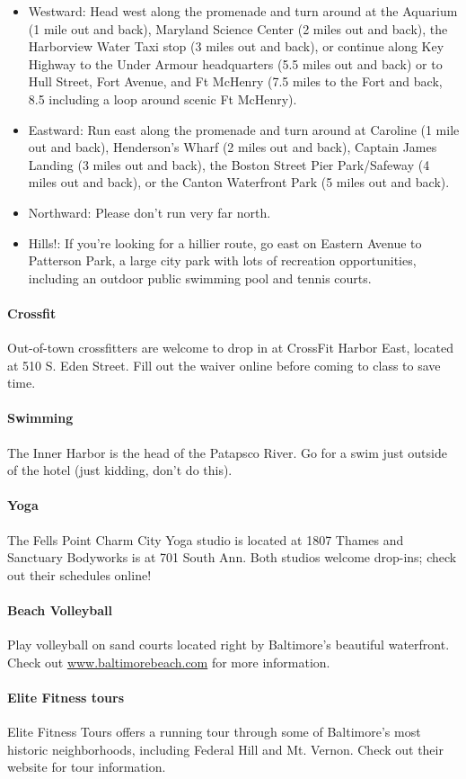 \begin{itemize}
\item{Westward: Head west along the promenade and turn around at the Aquarium (1 mile out and back), Maryland Science Center (2 miles out and back), the Harborview Water Taxi stop (3 miles out and back), or continue along Key Highway to the Under Armour headquarters (5.5 miles out and back) or to Hull Street, Fort Avenue, and Ft McHenry (7.5 miles to the Fort and back, 8.5 including a loop around scenic Ft McHenry).}
\item{Eastward: Run east along the promenade and turn around at Caroline (1 mile out and back), Henderson's Wharf (2 miles out and back), Captain James Landing (3 miles out and back), the Boston Street Pier Park/Safeway (4 miles out and back), or the Canton Waterfront Park (5 miles out and back).}
\item{Northward: Please don't run very far north.}
\item{Hills!: If you're looking for a hillier route, go east on Eastern Avenue to Patterson Park, a large city park with lots of recreation opportunities, including an outdoor public swimming pool and tennis courts.}
\end{itemize}

\paragraph*{Crossfit}
Out-of-town crossfitters are welcome to drop in at CrossFit Harbor East, located at 510 S. Eden Street. Fill out the waiver online before coming to class to save time.

\paragraph*{Swimming}
The Inner Harbor is the head of the Patapsco River. Go for a swim just outside of the hotel (just kidding, don't do this). 

\paragraph*{Yoga}
The Fells Point Charm City Yoga studio is located at 1807 Thames and Sanctuary Bodyworks is at 701 South Ann. Both studios welcome drop-ins; check out their schedules online! 

\paragraph*{Beach Volleyball}
Play volleyball on sand courts located right by Baltimore's beautiful waterfront. Check out \url{www.baltimorebeach.com} for more information.

\paragraph*{Elite Fitness tours}
Elite Fitness Tours offers a running tour through some of Baltimore's most historic neighborhoods, including Federal Hill and Mt. Vernon. Check out their website for tour information. 
